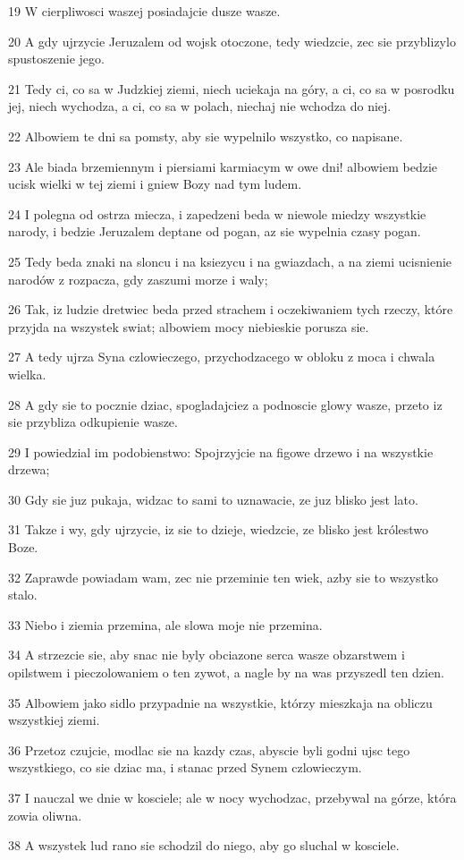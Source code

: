 \par 19 W cierpliwosci waszej posiadajcie dusze wasze.
\par 20 A gdy ujrzycie Jeruzalem od wojsk otoczone, tedy wiedzcie, zec sie przyblizylo spustoszenie jego.
\par 21 Tedy ci, co sa w Judzkiej ziemi, niech uciekaja na góry, a ci, co sa w posrodku jej, niech wychodza, a ci, co sa w polach, niechaj nie wchodza do niej.
\par 22 Albowiem te dni sa pomsty, aby sie wypelnilo wszystko, co napisane.
\par 23 Ale biada brzemiennym i piersiami karmiacym w owe dni! albowiem bedzie ucisk wielki w tej ziemi i gniew Bozy nad tym ludem.
\par 24 I polegna od ostrza miecza, i zapedzeni beda w niewole miedzy wszystkie narody, i bedzie Jeruzalem deptane od pogan, az sie wypelnia czasy pogan.
\par 25 Tedy beda znaki na sloncu i na ksiezycu i na gwiazdach, a na ziemi ucisnienie narodów z rozpacza, gdy zaszumi morze i waly;
\par 26 Tak, iz ludzie dretwiec beda przed strachem i oczekiwaniem tych rzeczy, które przyjda na wszystek swiat; albowiem mocy niebieskie porusza sie.
\par 27 A tedy ujrza Syna czlowieczego, przychodzacego w obloku z moca i chwala wielka.
\par 28 A gdy sie to pocznie dziac, spogladajciez a podnoscie glowy wasze, przeto iz sie przybliza odkupienie wasze.
\par 29 I powiedzial im podobienstwo: Spojrzyjcie na figowe drzewo i na wszystkie drzewa;
\par 30 Gdy sie juz pukaja, widzac to sami to uznawacie, ze juz blisko jest lato.
\par 31 Takze i wy, gdy ujrzycie, iz sie to dzieje, wiedzcie, ze blisko jest królestwo Boze.
\par 32 Zaprawde powiadam wam, zec nie przeminie ten wiek, azby sie to wszystko stalo.
\par 33 Niebo i ziemia przemina, ale slowa moje nie przemina.
\par 34 A strzezcie sie, aby snac nie byly obciazone serca wasze obzarstwem i opilstwem i pieczolowaniem o ten zywot, a nagle by na was przyszedl ten dzien.
\par 35 Albowiem jako sidlo przypadnie na wszystkie, którzy mieszkaja na obliczu wszystkiej ziemi.
\par 36 Przetoz czujcie, modlac sie na kazdy czas, abyscie byli godni ujsc tego wszystkiego, co sie dziac ma, i stanac przed Synem czlowieczym.
\par 37 I nauczal we dnie w kosciele; ale w nocy wychodzac, przebywal na górze, która zowia oliwna.
\par 38 A wszystek lud rano sie schodzil do niego, aby go sluchal w kosciele.

